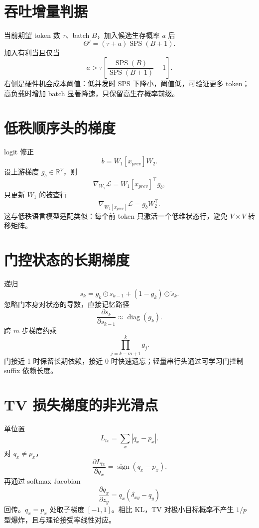 \documentclass[UTF8,12pt,a4paper,fontset=none]{ctexart}
\numberwithin{equation}{section}
\newcommand{\R}{\mathbb{R}}
\newcommand{\Loss}{\mathcal{L}}
\newcommand{\diag}{\operatorname{diag}}
\begin{document}
\section{吞吐增量判据}
当前期望 token 数 $\tau$、batch $B$，加入候选生存概率 $a$ 后
\begin{equation}
 \Theta'= (\tau+a)\operatorname{SPS}(B+1).
\end{equation}
加入有利当且仅当
\begin{equation}
 a>\tau\left[\frac{\operatorname{SPS}(B)}{\operatorname{SPS}(B+1)}-1\right].
\end{equation}
右侧是硬件机会成本阈值：低并发时 SPS 下降小，阈值低，可验证更多 token；高负载时增加 batch 显著降速，只保留高生存概率前缀。

\section{低秩顺序头的梯度}
logit 修正
\begin{equation}
 b=W_1[x_{prev}]W_2.
\end{equation}
设上游梯度 $g_b\in\R^V$，则
\begin{equation}
 \nabla_{W_2}\Loss=W_1[x_{prev}]^\top g_b,
\end{equation}
只更新 $W_1$ 的被查行
\begin{equation}
 \nabla_{W_1[x_{prev}]}\Loss=g_bW_2^\top.
\end{equation}
这与低秩语言模型适配类似：每个前 token 只激活一个低维状态行，避免 $V\times V$ 转移矩阵。

\section{门控状态的长期梯度}
递归
\begin{equation}
 s_k=g_k\odot s_{k-1}+(1-g_k)\odot\widetilde s_k.
\end{equation}
忽略门本身对状态的导数，直接记忆路径
\begin{equation}
 \frac{\partial s_k}{\partial s_{k-1}}\approx\diag(g_k).
\end{equation}
跨 $m$ 步梯度约乘
\begin{equation}
 \prod_{j=k-m+1}^{k}g_j.
\end{equation}
门接近 1 时保留长期依赖，接近 0 时快速遗忘；轻量串行头通过可学习门控制 suffix 依赖长度。

\section{TV 损失梯度的非光滑点}
单位置
\begin{equation}
 L_{tv}=\sum_x|q_x-p_x|.
\end{equation}
对 $q_x\ne p_x$，
\begin{equation}
 \frac{\partial L_{tv}}{\partial q_x}=\operatorname{sign}(q_x-p_x).
\end{equation}
再通过 softmax Jacobian
\begin{equation}
 \frac{\partial q_x}{\partial z_y}=q_x(\delta_{xy}-q_y)
\end{equation}
回传。$q_x=p_x$ 处取子梯度 $[-1,1]$。相比 KL，TV 对极小目标概率不产生 $1/p$ 型爆炸，且与理论接受率线性对应。
\end{document}
